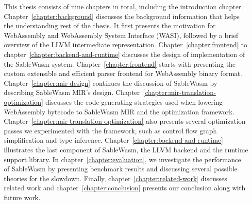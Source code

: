 This thesis consists of nine chapters in total, including the introduction
chapter.
Chapter~\ref{chapter:background} discusses the background information that helps
the understanding rest of the thesis. It first presents the motivation for
WebAssembly and WebAssembly System Interface (WASI), followed by a brief
overview of the LLVM intermediate representation.
Chapter~\ref{chapter:frontend} to chapter~\ref{chapter:backend-and-runtime}
discusses the design of implementation of the SableWasm system.
Chapter~\ref{chapter:frontend} starts with presenting the custom extensible and
efficient parser frontend for WebAssembly binary format.
Chapter~\ref{chapter:mir-design} continues the discussion of SableWasm by
describing SableWasm MIR's design.
Chapter~\ref{chapter:mir-translation-optimization} discusses the code
generating strategies used when lowering WebAssembly bytecode to SableWasm MIR
and the optimization framework.
Chapter~\ref{chapter:mir-translation-optimization} also presents several
optimization passes we experimented with the framework, such as control flow
graph simplification and type inference.
Chapter~\ref{chapter:backend-and-runtime} illustrates the last component of
SableWasm, the LLVM backend and the runtime support library.
In chapter~\ref{chapter:evaluation}, we investigate the performance of SableWasm
by presenting benchmark results and discussing several possible theories for the
slowdown.
Finally, chapter~\ref{chapter:related-work} discusses related work and
chapter~\ref{chapter:conclusion} presents our conclusion along with future work.